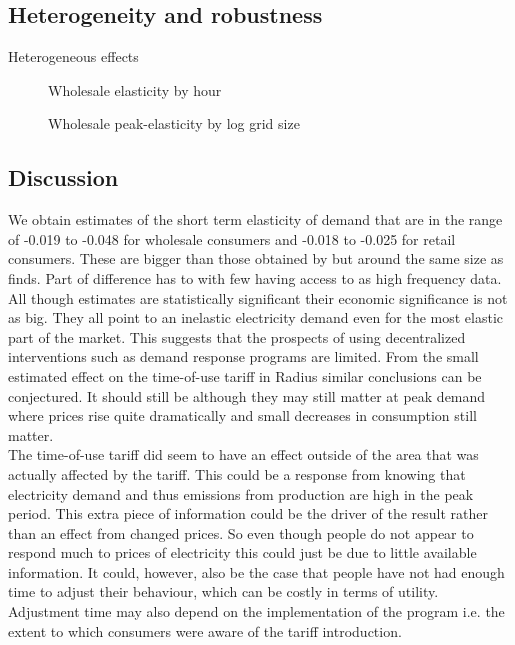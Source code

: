 \subsection{Heterogeneity and robustness}
\label{subsec:r_robustness}


Heterogeneous effects
\begin{figure}[H]
  \centering
  \caption{Wholesale elasticity by hour}
  \label{fig:ws_elasticity_hour}
\end{figure}

\begin{figure}[H]
  \centering
  \caption{Wholesale peak-elasticity by log grid size}
  \label{fig:ws_elasticity_grid}
\end{figure}


\subsection{Discussion}
\label{subsec:r_discussion}
We obtain estimates of the short term elasticity of demand that are in the range of -0.019 to -0.048 for wholesale consumers and -0.018 to -0.025 for retail consumers. These are bigger than those obtained by \cite{lijesen2007real} but around the same size as \cite{wolak2001impact} finds. Part of difference has to with few having access to as high frequency data.  %
All though estimates are statistically significant their economic significance is not as big. They all point to an inelastic electricity demand even for the most elastic part of the market. This suggests that the prospects of using decentralized interventions such as demand response programs are limited. From the small estimated effect on the time-of-use tariff in Radius similar conclusions can be conjectured. It should still be although they may still matter at peak demand where prices rise quite dramatically and small decreases in consumption still matter.
\smallskip \\

The time-of-use tariff did seem to have an effect outside of the area that was actually affected by the tariff. This could be a response from knowing that electricity demand and thus emissions from production are high in the peak period. This extra piece of information could be the driver of the result rather than an effect from changed prices. So even though people do not appear to respond much to prices of electricity this could just be due to little available information. It could, however, also be the case that people have not had enough time to adjust their behaviour, which can be costly in terms of utility. Adjustment time may also depend on the implementation of the program i.e. the extent to which consumers were aware of the tariff introduction.
\smallskip \\

